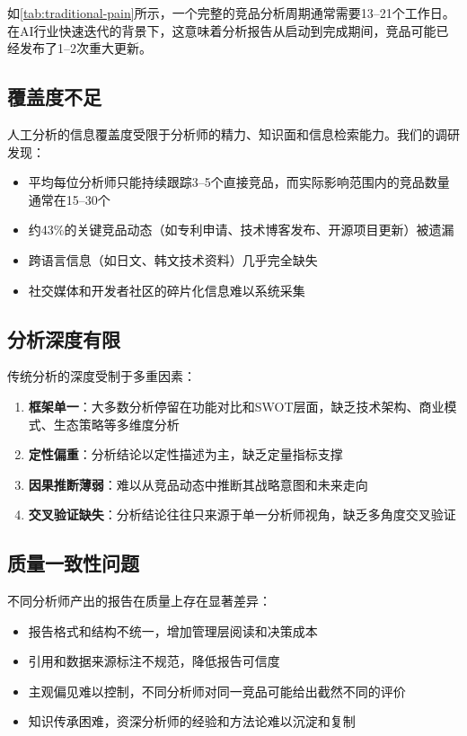 \documentclass[12pt,a4paper]{ctexrep}
\begin{document}
如\cref{tab:traditional-pain}所示，一个完整的竞品分析周期通常需要13--21个工作日。在AI行业快速迭代的背景下，这意味着分析报告从启动到完成期间，竞品可能已经发布了1--2次重大更新。

\subsection{覆盖度不足}

人工分析的信息覆盖度受限于分析师的精力、知识面和信息检索能力。我们的调研发现：

\begin{itemize}[leftmargin=2em]
\item 平均每位分析师只能持续跟踪3--5个直接竞品，而实际影响范围内的竞品数量通常在15--30个
\item 约43\%的关键竞品动态（如专利申请、技术博客发布、开源项目更新）被遗漏
\item 跨语言信息（如日文、韩文技术资料）几乎完全缺失
\item 社交媒体和开发者社区的碎片化信息难以系统采集
\end{itemize}

\subsection{分析深度有限}

传统分析的深度受制于多重因素：

\begin{enumerate}[leftmargin=2em]
\item \textbf{框架单一}：大多数分析停留在功能对比和SWOT层面，缺乏技术架构、商业模式、生态策略等多维度分析
\item \textbf{定性偏重}：分析结论以定性描述为主，缺乏定量指标支撑
\item \textbf{因果推断薄弱}：难以从竞品动态中推断其战略意图和未来走向
\item \textbf{交叉验证缺失}：分析结论往往只来源于单一分析师视角，缺乏多角度交叉验证
\end{enumerate}

\subsection{质量一致性问题}

不同分析师产出的报告在质量上存在显著差异：

\begin{itemize}[leftmargin=2em]
\item 报告格式和结构不统一，增加管理层阅读和决策成本
\item 引用和数据来源标注不规范，降低报告可信度
\item 主观偏见难以控制，不同分析师对同一竞品可能给出截然不同的评价
\item 知识传承困难，资深分析师的经验和方法论难以沉淀和复制
\end{itemize}
\end{document}

